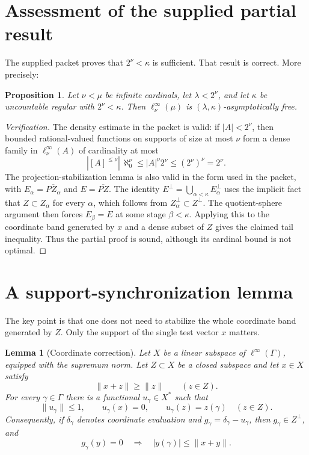 \documentclass[11pt]{article}
\newtheorem{proposition}[theorem]{Proposition}
\newtheorem{lemma}[theorem]{Lemma}
\theoremstyle{remark}
\begin{document}
\section{Assessment of the supplied partial result}

The supplied packet proves that \(2^\nu<\kappa\) is sufficient.  That
result is correct.  More precisely:

\begin{proposition}
Let \(\nu<\mu\) be infinite cardinals, let \(\lambda<2^\nu\), and let
\(\kappa\) be uncountable regular with \(2^\nu<\kappa\).  Then
\(\ell_\nu^\infty(\mu)\) is
\((\lambda,\kappa)\)-asymptotically free.
\end{proposition}

\begin{proof}[Verification]
The density estimate in the packet is valid: if \(|A|<2^\nu\), then
bounded rational-valued functions on supports of size at most \(\nu\)
form a dense family in \(\ell_\nu^\infty(A)\) of cardinality at most
\[
 |[A]^{\leq\nu}|\,\aleph_0^\nu
 \leq |A|^\nu 2^\nu
 \leq (2^\nu)^\nu=2^\nu.
\]
The projection-stabilization lemma is also valid in the form used in the
packet, with
\(E_\alpha=\overline{PZ_\alpha}\) and
\(E=\overline{PZ}\).  The identity
\(E^\perp=\bigcup_{\alpha<\kappa}E_\alpha^\perp\) uses the implicit fact
that \(Z\subset Z_\alpha\) for every \(\alpha\), which follows from
\(Z_\alpha^\perp\subset Z^\perp\).  The quotient-sphere argument then
forces \(E_\beta=E\) at some stage \(\beta<\kappa\).  Applying this to the
coordinate band generated by \(x\) and a dense subset of \(Z\) gives the
claimed tail inequality.  Thus the partial proof is sound, although its
cardinal bound is not optimal.
\end{proof}

\section{A support-synchronization lemma}

The key point is that one does not need to stabilize the whole coordinate
band generated by \(Z\).  Only the support of the single test vector
\(x\) matters.

\begin{lemma}[Coordinate correction]
\label{lem:correction}
Let \(X\) be a linear subspace of \(\ell^\infty(\Gamma)\), equipped with
the supremum norm.  Let \(Z\subset X\) be a closed subspace and let
\(x\in X\) satisfy
\[
  \|x+z\|\geq\|z\|\qquad(z\in Z).
\]
For every \(\gamma\in\Gamma\) there is a functional
\(u_\gamma\in X^*\) such that
\[
 \|u_\gamma\|\leq1,\qquad
 u_\gamma(x)=0,\qquad
 u_\gamma(z)=z(\gamma)\quad(z\in Z).
\]
Consequently, if \(\delta_\gamma\) denotes coordinate evaluation and
\(g_\gamma=\delta_\gamma-u_\gamma\), then
\(g_\gamma\in Z^\perp\), and
\[
 g_\gamma(y)=0
 \quad\Longrightarrow\quad
 |y(\gamma)|\leq\|x+y\|.
\]
\end{lemma}
\end{document}
